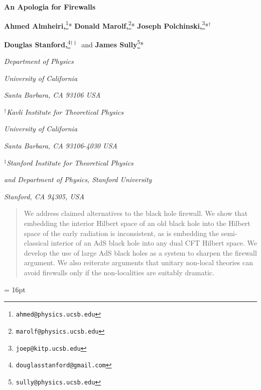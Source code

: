 \documentclass[12pt]{article}
\begin{document}



\begin{titlepage}
\bigskip
\bigskip\bigskip\bigskip
\centerline{\Large \bf An Apologia for Firewalls}



\bigskip\bigskip\bigskip
\bigskip\bigskip\bigskip


 \centerline{{\bf Ahmed Almheiri,}\footnote{\tt ahmed@physics.ucsb.edu}*
 {\bf Donald Marolf,}\footnote{\tt marolf@physics.ucsb.edu}*
 {\bf Joseph Polchinski,}\footnote{\tt joep@kitp.ucsb.edu}*${}^\dagger$}
 \centerline{ {\bf Douglas Stanford,}\footnote{\tt douglasstanford@gmail.com}${}^{\dagger \ddagger}$\
 and {\bf James Sully}\footnote{\tt sully@physics.ucsb.edu}*}
\bigskip
\centerline{\em *Department of Physics}
\centerline{\em University of California}
\centerline{\em Santa Barbara, CA 93106 USA}
\bigskip
\centerline{\em ${}^\dagger$Kavli Institute for Theoretical Physics}
\centerline{\em University of California}
\centerline{\em Santa Barbara, CA 93106-4030 USA}
\bigskip
\centerline{\em ${}^\ddagger$Stanford Institute for Theoretical Physics }
\centerline{\em and Department of Physics, Stanford University}
\centerline{\em Stanford, CA 94305, USA}
\bigskip\bigskip\bigskip



\begin{abstract}

We address claimed alternatives to the black hole firewall.  We show
that embedding the interior Hilbert space of an old black hole into the Hilbert space of the early radiation is inconsistent, as is embedding the semi-classical interior of an AdS black hole into any dual CFT Hilbert space.  We develop the use of large AdS black holes as a system to sharpen the firewall argument.  We also reiterate arguments that unitary non-local theories can avoid firewalls only if the non-localities are suitably dramatic.

\end{abstract}
\end{titlepage}

\baselineskip = 16pt

\tableofcontents



\setcounter{footnote}{0}
\end{document}

